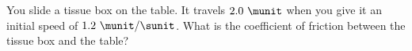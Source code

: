You slide a tissue box on the table. It travels $2.0\ \munit$ when
you give it an initial speed of $1.2\ \munit / \sunit$. What is the
coefficient of friction between the tissue box and the table?\answercheck

